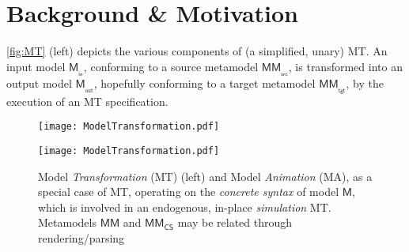 \section{Background \& Motivation}
\label{sec:Motivation}

\autoref{fig:MT} (left) depicts the various components of (a simplified, unary) MT. 
An input model $\mathsf{M}_{_{\mathsf{in}}}$, conforming to a source metamodel 
$\mathsf{MM}_{_{\mathsf{src}}}$, is transformed into an output model 
$\mathsf{M}_{_{\mathsf{out}}}$, hopefully conforming to a target metamodel
$\mathsf{MM}_{_{\mathsf{tgt}}}$, by the execution of an MT specification.

\begin{figure}[t]%
   \begin{minipage}[t]{0.48\columnwidth}
      \texttt{[image: ModelTransformation.pdf]}
   \end{minipage}
   \hfill
   \begin{minipage}[b]{0.48\columnwidth}
   \texttt{[image: ModelTransformation.pdf]}%
   \end{minipage}
   \caption{Model \emph{Transformation} (MT) (left) and Model \emph{Animation} (MA),
   as a special case of MT, operating on the \emph{concrete syntax} of model $\mathsf{M}$,
   which is involved in an endogenous, in-place \emph{simulation} MT. Metamodels
   $\mathsf{MM}$ and $\mathsf{MM}_{\mathsf{CS}}$ may be related through rendering/parsing}%
   \label{fig:MT}%
\end{figure}


